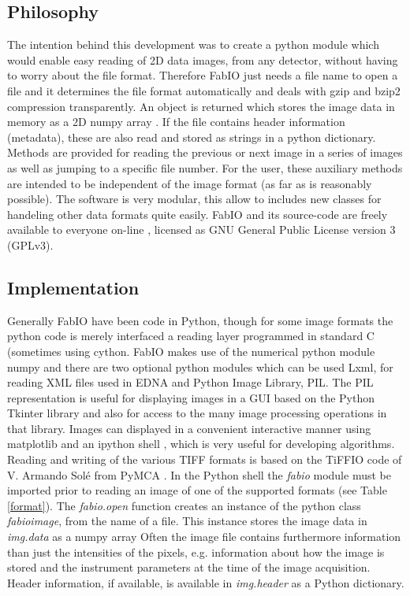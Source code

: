 \documentclass{iucr}
\begin{document}
\subsection{Philosophy}

The intention behind this development was to create a python module which would enable easy reading
of 2D data images, from any detector, without having to worry about
the file format.
Therefore FabIO just needs a file name to open a file and it determines the
file format automatically and deals with gzip \cite{gzip} and bzip2
\cite{bzip2} compression transparently.
An object is returned which stores the image data in memory as a 2D
numpy array \cite{numpy}.
If the file contains header information (metadata), these are also read and stored
as strings in a python dictionary.
Methods are provided for reading the previous or next image in
a series of images as well as jumping to a specific file number.
For the user, these auxiliary methods are intended to be independent of
the image format (as far as is reasonably possible).
The software is very modular, this allow to includes new classes for handeling 
other data formats quite easily. 
FabIO and its source-code are freely available to everyone on-line \cite{fabio}, 
licensed as GNU General Public License version 3 (GPLv3). 

\subsection{Implementation}

Generally FabIO have been code in Python\cite{python},
though for some image formats the python code is merely interfaced a reading
layer programmed in standard C (sometimes using cython\cite{cython}.
FabIO makes use of the numerical python module numpy\cite{numpy} and there are
two optional python modules which can be used Lxml, for reading XML files
used in EDNA\cite{edna} and Python Image Library, PIL\cite{pil}.
The PIL representation is useful for displaying images in a GUI based on
the Python Tkinter library\cite{tkinter} and also for access
to the many image processing operations in that library.
Images can displayed in a convenient interactive manner using
matplotlib\cite{matplotlib} and an ipython shell \cite{ipython}, which is
very useful for developing algorithms.
Reading and writing of the various TIFF \cite{tiff} formats is based on the
TiFFIO code of V. Armando Sol\'e from PyMCA \cite{pymca}.
In the Python shell the {\em fabio} module must be imported prior to reading an
image of one of the supported formats (see Table \ref{format}).
The {\em fabio.open} function creates an instance of the python class {\em fabioimage},
from the name of a file.
This instance stores the image data in {\em img.data} as a numpy array
Often the image file contains furthermore information than just
the intensities of the pixels, e.g. information about how the image is
stored and the instrument parameters at the time of the image acquisition.
Header information, if available, is available in {\em img.header} as a Python
dictionary.
\end{document}
